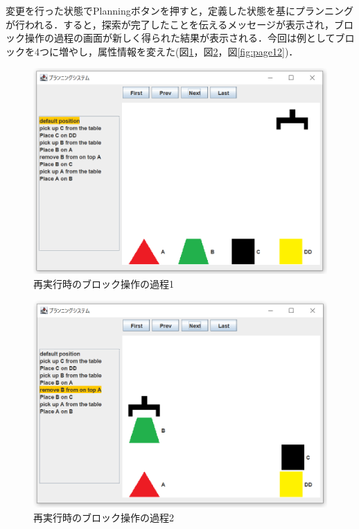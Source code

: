 \documentclass[12pt]{jarticle}
\begin{document}
変更を行った状態でPlanningボタンを押すと，定義した状態を基にプランニングが行われる．すると，探索が完了したことを伝えるメッセージが表示され，ブロック操作の過程の画面が新しく得られた結果が表示される．今回は例としてブロックを4つに増やし，属性情報を変えた(図\ref{fig:page10}，図\ref{fig:page11}，図\ref{fig:page12})．\\

\begin{figure}[htbp]
  \begin{center}
    \includegraphics[scale=0.6]{images/page10.PNG}
    \caption{再実行時のブロック操作の過程1}
    \label{fig:page10}
  \end{center}
\end{figure}
\begin{figure}[htbp]
  \begin{center}
    \includegraphics[scale=0.6]{images/page11.PNG}
    \caption{再実行時のブロック操作の過程2}
    \label{fig:page11}
  \end{center}
\end{figure}
\end{document}
